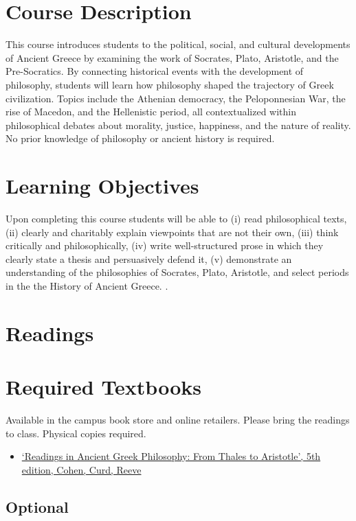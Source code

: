 \documentclass[article,oneside]{memoir}
\begin{document}
\section{Course Description}

This course introduces students to the political, social, and cultural developments of Ancient Greece by examining the work of Socrates, Plato, Aristotle, and the Pre-Socratics. By connecting historical events with the development of philosophy, students will learn how philosophy shaped the trajectory of Greek civilization. Topics include the Athenian democracy, the Peloponnesian War, the rise of Macedon, and the Hellenistic period, all contextualized within philosophical debates about morality, justice, happiness, and the nature of reality.  No prior knowledge of philosophy or ancient history is required.

\section{Learning Objectives}

Upon completing this course students will be able to (i) read philosophical texts, (ii) clearly and charitably explain viewpoints that
are not their own, (iii) think critically and philosophically, (iv) write well-structured prose in which they clearly state a thesis and persuasively defend it, (v) demonstrate an understanding of the philosophies of Socrates, Plato, Aristotle, and select periods in the the History of Ancient Greece. .


\section{Readings}
\section{Required Textbooks}

Available in the campus book store and online retailers. Please bring the readings to class. Physical copies required.
\begin{itemize}
\item \href{https://www.amazon.com/Readings-Ancient-Greek-Philosophy-Aristotle/dp/1624665322/ref=dp_ob_title_bk}{`Readings in Ancient Greek Philosophy: From Thales to Aristotle', 5th edition, Cohen, Curd, Reeve}


\end{itemize}
\subsection{Optional}
\end{document}
